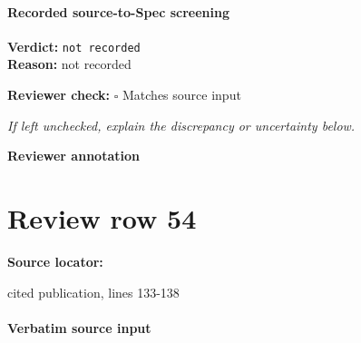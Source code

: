\documentclass[10pt]{article}
\newcommand{\reviewerbox}{%
  \par\noindent\fbox{\parbox{0.96\linewidth}{\rule{0pt}{0.38in}}}\par
}
\newcommand{\reviewmatch}[1]{%
  \par\noindent\textbf{Reviewer check:} $\square$\; #1\par
  \noindent\emph{If left unchecked, explain the discrepancy or uncertainty below.}\par
}
\begin{document}
\paragraph{Recorded source-to-Spec screening}
\textbf{Verdict:} \texttt{not recorded}
\\
\textbf{Reason:} not recorded
\reviewmatch{Matches source input}
\noindent\textbf{Reviewer annotation}\par
\reviewerbox
\clearpage
\hypertarget{source-claim-961880e0b1d1c772}{}
\section*{Review row 54}
\textbf{Source locator:} {\footnotesize\raggedright cited publication, lines 133-\allowbreak{}138\par}
\paragraph{Verbatim source input}
\end{document}
